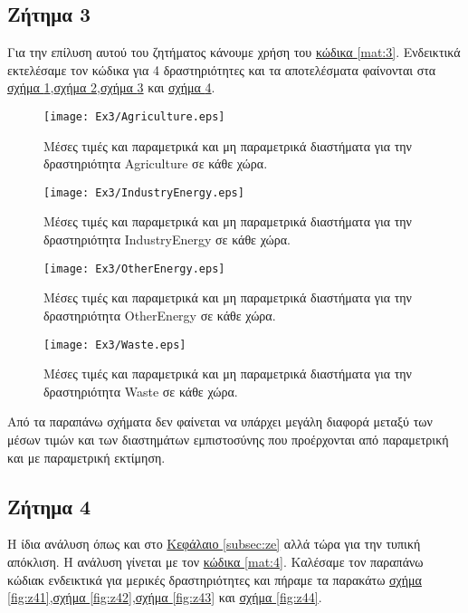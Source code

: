 \documentclass[11pt]{scrartcl} %
\begin{document}
\subsection{Ζήτημα 3}
\label{subsec:z3}

Για την επίλυση αυτού του ζητήματος κάνουμε χρήση του \hyperref[mat:3]{κώδικα \ref*{mat:3}}. Ενδεικτικά εκτελέσαμε τον κώδικα για 4 δραστηριότητες και τα αποτελέσματα φαίνονται στα \hyperref[fig:z31]{σχήμα \ref*{fig:z31}},\hyperref[fig:z32]{σχήμα \ref*{fig:z32}},\hyperref[fig:z33]{σχήμα \ref*{fig:z33}} και \hyperref[fig:z34]{σχήμα \ref*{fig:z34}}.


\begin{figure}[H]
\label{fig:z31} 
	\centering
	\texttt{[image: Ex3/Agriculture.eps]}	
\caption{Μέσες τιμές και παραμετρικά και μη παραμετρικά διαστήματα για την δραστηριότητα Agriculture σε κάθε χώρα.}
\end{figure}

\begin{figure}[H]
\label{fig:z32} 
	\centering
	\texttt{[image: Ex3/IndustryEnergy.eps]}	
\caption{Μέσες τιμές και παραμετρικά και μη παραμετρικά διαστήματα για την δραστηριότητα IndustryEnergy σε κάθε χώρα.}
\end{figure}

\begin{figure}[H]
\label{fig:z33} 
	\centering
	\texttt{[image: Ex3/OtherEnergy.eps]}	
\caption{Μέσες τιμές και παραμετρικά και μη παραμετρικά διαστήματα για την δραστηριότητα OtherEnergy σε κάθε χώρα.}
\end{figure}

\begin{figure}[H]
\label{fig:z34} 
	\centering
	\texttt{[image: Ex3/Waste.eps]}	
\caption{Μέσες τιμές και παραμετρικά και μη παραμετρικά διαστήματα για την δραστηριότητα Waste σε κάθε χώρα.}
\end{figure}


Από τα παραπάνω σχήματα δεν φαίνεται να υπάρχει μεγάλη διαφορά μεταξύ των μέσων τιμών και των διαστημάτων εμπιστοσύνης που προέρχονται από παραμετρική και με παραμετρική εκτίμηση.

\subsection{Ζήτημα 4}
\label{subsec:z4}

Η ίδια ανάλυση όπως και στο \hyperref[subsec:z3]{Κεφάλαιο \ref*{subsec:ze}} αλλά τώρα για την τυπική απόκλιση. Η ανάλυση γίνεται με τον \hyperref[mat:4]{κώδικα \ref*{mat:4}}. Καλέσαμε τον παραπάνω κώδιακ ενδεικτικά για μερικές δραστηριότητες και πήραμε τα παρακάτω \hyperref[fig:z41]{σχήμα \ref*{fig:z41}},\hyperref[fig:z42]{σχήμα \ref*{fig:z42}},\hyperref[fig:z43]{σχήμα \ref*{fig:z43}} και \hyperref[fig:z44]{σχήμα \ref*{fig:z44}}.
\end{document}

